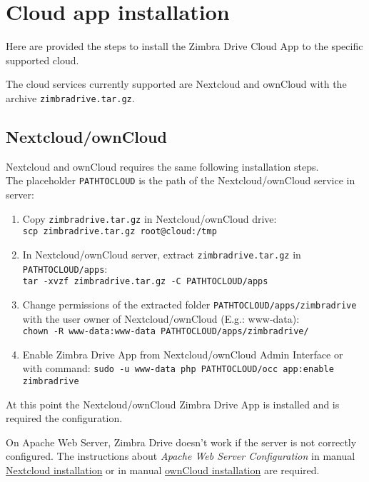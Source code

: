 \section{Cloud app installation}

Here are provided the steps to install the Zimbra Drive Cloud App to the specific supported cloud.
\begin{warning}
The cloud services currently supported are Nextcloud and ownCloud with the archive \texttt{zimbradrive.tar.gz}.
\end{warning}

\subsection{Nextcloud/ownCloud}\label{==subsec:NextcloudownCloudInstallation==}
    Nextcloud and ownCloud requires the same following installation steps.\\
    The placeholder \texttt{PATH\textunderscore TO\textunderscore CLOUD} is the path of the Nextcloud/ownCloud service in server:

    \begin{enumerate}
        \item Copy \texttt{zimbradrive.tar.gz} in Nextcloud/ownCloud drive:\\
        \texttt{scp zimbradrive.tar.gz root@cloud:/tmp}

        \item In Nextcloud/ownCloud server, extract \texttt{zimbradrive.tar.gz}  in \texttt{PATH\textunderscore TO\textunderscore CLOUD/apps}:\\
        \texttt{tar -xvzf zimbradrive.tar.gz -C \texttt{PATH\textunderscore TO\textunderscore CLOUD}/apps}
        
        \item Change permissions of the extracted folder \texttt{PATH\textunderscore TO\textunderscore CLOUD/apps/zimbradrive}
        with the user owner of Nextcloud/ownCloud (E.g.: www-data):\\
        \texttt{chown -R www-data:www-data PATH\textunderscore TO\textunderscore CLOUD/apps/zimbradrive/}
        
        \item Enable Zimbra Drive App from Nextcloud/ownCloud Admin Interface or with command: %
        \texttt{sudo -u www-data php PATH\textunderscore TO\textunderscore CLOUD/occ app:enable zimbradrive}
    \end{enumerate}

    At this point the Nextcloud/ownCloud Zimbra Drive App is installed and is required the configuration.
\begin{warning}
On Apache Web Server, Zimbra Drive doesn't work if the server is not correctly configured.
The instructions about \textit{Apache Web Server Configuration} in manual
\href{https://docs.nextcloud.com/server/11/admin_manual/installation/source_installation.html#apache-web-server-configuration}{Nextcloud installation}
or in manual
\href{https://doc.owncloud.org/server/10.0/admin_manual/installation/source_installation.html#apache-web-server-configuration}{ownCloud installation}
are required.
\end{warning}